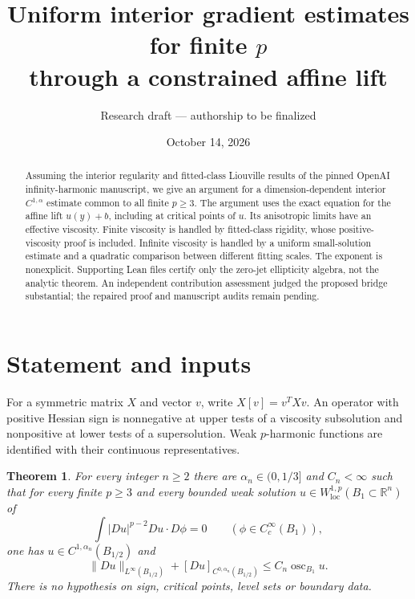 \documentclass[11pt]{article}
\title{Uniform interior gradient estimates for finite $p$\texorpdfstring{\\}{ }through a constrained affine lift}
\author{Research draft --- authorship to be finalized}
\date{October 14, 2026}
\newtheorem{theorem}{Theorem}[section]
\theoremstyle{remark}\newtheorem{remark}[theorem]{Remark}
\newcommand{\osc}{\operatorname{osc}}
\newcommand{\R}{\mathbb R}
\begin{document}
\maketitle
\begin{center}
\end{center}
\begin{abstract}
Assuming the interior regularity and fitted-class Liouville results
of the pinned OpenAI infinity-harmonic manuscript, we give an argument
for a dimension-dependent interior $C^{1,\alpha}$ estimate common to
all finite $p\geq3$. The argument uses the exact equation for the
affine lift $u(y)+b$, including at critical points of $u$. Its
anisotropic limits have an effective viscosity. Finite viscosity is
handled by fitted-class rigidity, whose positive-viscosity proof is
included. Infinite viscosity is handled by a uniform small-solution
estimate and a quadratic comparison between different fitting scales.
The exponent is nonexplicit. Supporting Lean files certify only the
zero-jet ellipticity algebra, not the analytic theorem. An independent
contribution assessment judged the proposed bridge substantial;
the repaired proof and manuscript audits remain pending.
\end{abstract}

\section{Statement and inputs}

For a symmetric matrix $X$ and vector $v$, write $X[v]=v^TXv$.
An operator with positive Hessian sign is nonnegative at upper tests
of a viscosity subsolution and nonpositive at lower tests of a
supersolution. Weak $p$-harmonic functions are identified with their
continuous representatives.

\begin{theorem}\label{thm:main}
For every integer $n\geq2$ there are $\alpha_n\in(0,1/3]$ and
$C_n<\infty$ such that for every finite $p\geq3$ and every bounded
weak solution $u\in W^{1,p}_{\mathrm{loc}}(B_1\subset\R^n)$ of
\[
 \int |Du|^{p-2}Du\cdot D\phi=0\qquad(\phi\in C_c^\infty(B_1)),
\]
one has $u\in C^{1,\alpha_n}(B_{1/2})$ and
\begin{equation}\label{eq:main}
 \|Du\|_{L^\infty(B_{1/2})}+[Du]_{C^{0,\alpha_n}(B_{1/2})}
 \leq C_n\osc_{B_1}u.
\end{equation}
There is no hypothesis on sign, critical points, level sets or boundary data.
\end{theorem}
\end{document}
